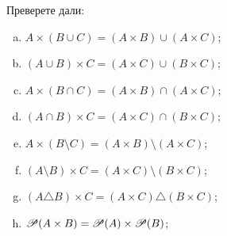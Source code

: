 \begin{problem}
  Преверете дали:
  \begin{enumerate}[a)]
  \item 
    $A\times(B\cup C) = (A\times B) \cup (A\times C)$;
  \item
    $(A\cup B)\times C = (A\times C)\cup (B\times C)$;
  \item 
    $A\times(B\cap C) = (A\times B) \cap (A\times C)$;
  \item
    $(A \cap B)\times C = (A \times C)\cap(B\times C)$;
  \item 
    $A\times(B\setminus C) = (A\times B) \setminus (A\times C)$;
  \item
    $(A\setminus B)\times C = (A\times C)\setminus (B\times C)$;
  \item
    $(A\triangle B)\times C = (A\times C)\triangle (B\times C)$;
  \item
    $\mathscr{P}(A \times B) = \mathscr{P}(A) \times \mathscr{P}(B)$;
  \end{enumerate}
\end{problem}

